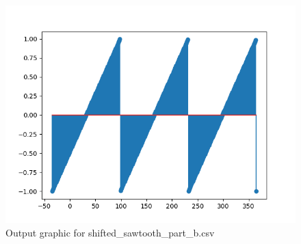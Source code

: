 \documentclass[10pt,a4paper, margin=1in]{article}
\begin{document}
\begin{enumerate}
\begin{enumerate}
                    \begin{figure}[H]
                        \centering
                        \includegraphics[scale=0.75]{shifted_sawtooth_part_b.png}
                        \caption{Output graphic for shifted\_sawtooth\_part\_b.csv}
                    \end{figure}
          \end{enumerate}

\end{enumerate}
\end{document}
